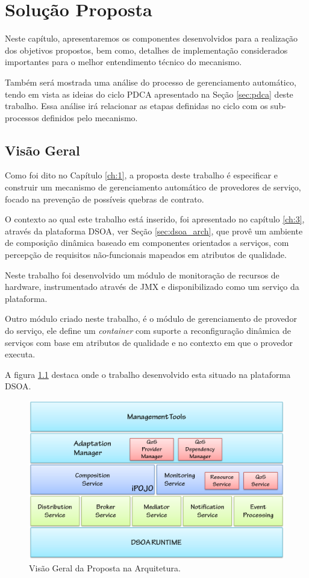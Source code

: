 \chapter{Solução Proposta}
\label{ch:4}

Neste capítulo, apresentaremos os componentes desenvolvidos para a realização dos objetivos propostos, bem como, detalhes de implementação considerados importantes para o melhor entendimento técnico do mecanismo. 

Também será mostrada uma análise do processo de gerenciamento automático, tendo em vista as ideias do ciclo PDCA apresentado na Seção \ref{sec:pdca} deste trabalho. Essa análise irá relacionar as etapas definidas no ciclo com os sub-processos definidos pelo mecanismo.

\section{Visão Geral}
Como foi dito no Capítulo \ref{ch:1}, a proposta deste trabalho é especificar e construir um mecanismo de gerenciamento automático de provedores de serviço, focado na prevenção de possíveis quebras de contrato.

O contexto ao qual este trabalho está inserido, foi apresentado no capítulo \ref{ch:3}, através da plataforma DSOA, ver Seção \ref{sec:dsoa_arch}, que provê um ambiente de composição dinâmica baseado em componentes orientados a serviços, com percepção de requisitos não-funcionais mapeados em atributos de qualidade.

Neste trabalho foi desenvolvido um módulo de monitoração de recursos de hardware, instrumentado através de JMX e disponibilizado como um serviço da plataforma. 

Outro módulo criado neste trabalho, é o módulo de gerenciamento de provedor do serviço, ele define um \textit{container} com suporte a reconfiguração dinâmica de serviços com base em atributos de qualidade e no contexto em que o provedor executa.

A figura \ref{fig:proposal} destaca onde o trabalho desenvolvido esta situado na plataforma DSOA.

\begin{figure}[htp]
\centering
\includegraphics[width=12cm]{chapters/chapter4/proposal_dsoa.png}
\caption[Visão Geral da Proposta na Arquitetura]{Visão Geral da Proposta na Arquitetura.}
\label{fig:proposal}
\end{figure}

